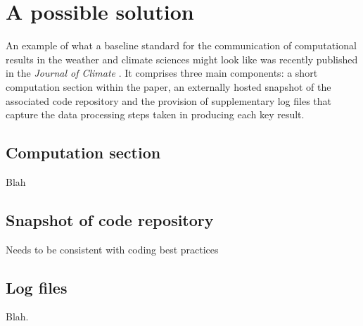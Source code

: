\section{A possible solution}

An example of what a baseline standard for the communication of computational results in the weather and climate sciences might look like was recently published in the \textit{Journal of Climate} \citep{Irving2015}. It comprises three main components: a short computation section within the paper, an externally hosted snapshot of the associated code repository and the provision of supplementary log files that capture the data processing steps taken in producing each key result. 

\subsection{Computation section}

Blah

\subsection{Snapshot of code repository}

Needs to be consistent with coding best practices \citep{Wilson2014a}

\subsection{Log files}

Blah.